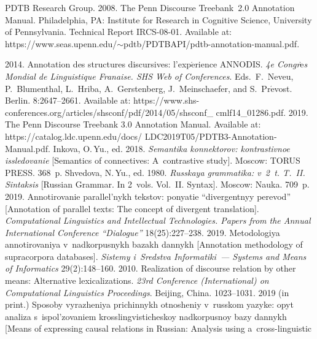 \begin{multicols}{2}
{{\begin{thebibliography}{99}
PDTB Research Group. 2008. The Penn Discourse Treebank~2.0 Annotation 
Manual.  Philadelphia, PA: Institute for Research in 
Cognitive Science, University of Pennsylvania. Technical Report IRCS-08-01.
Available at: {\sf 
https://www.seas.upenn.edu/$\sim$pdtb/PDTBAPI/pdtb-annotation-manual.pdf}.

 2014.  
Annotation des structures discursives: l'exp$\acute{\mbox{e}}$rience ANNODIS. 
\textit{4e Congr$\grave{\mbox{e}}$s Mondial de Linguistique 
\mbox{Fran{\normalsize\!}aise}. SHS Web of Conferences}.  Eds.\ 
F.~Neveu, P.~Blumenthal, L.~Hriba, A.~Gerstenberg, J.~Meinschaefer, 
and S.~Pr$\acute{\mbox{e}}$vost.  Berlin. 8:2647--2661. Available at: {\sf  
https://www.shs-conferences.org/articles/shsconf/pdf/2014/05/shsconf\_ cmlf14\_01286.pdf}.
\bibitem{10-in-1}
 2019. The Penn Discourse 
Treebank 3.0 Annotation Manual. Available at: {\sf 
https://catalog.ldc.upenn.edu/docs/ LDC2019T05/PDTB3-Annotation-Manual.pdf}.
\bibitem{11-in-1}
Inkova, O.\,Yu., ed. 2018. \textit{Semantika konnektorov: kontrastivnoe 
issledovanie} [Semantics of connectives: A~contrastive study]. Moscow: TORUS 
PRESS. 368~p.
Shvedova, N.\,Yu., ed. 1980. \textit{Russkaya grammatika: v~2~t. T.~II. Sintaksis} 
[Russian Grammar. In 2~vols. Vol.~II. Syntax]. Moscow: Nauka.  709~p.
\bibitem{13-in-1}
 2019. Annotirovanie parallel'nykh tekstov: ponyatie 
``divergentnyy perevod'' [Annotation of parallel texts: The concept of divergent 
translation]. \textit{Computational Linguistics and 
Intellectual Technologies. Papers from the Annual International Conference 
``Dialogue''} 18(25):227--238.
 2019. 
Metodologiya annotirovaniya v~nadkorpusnykh bazakh dannykh [Annotation 
methodology of supracorpora databases]. \textit{Sistemy i~Sredstva  
Informatiki~--- Systems and Means of Informatics} 29(2):148--160.
\bibitem{15-in-1}
 2010. Realization of discourse relation 
by other means: Alternative lexicalizations. \textit{23rd 
Conference (International) on Computational Linguistics Proceedings}. Beijing, 
China. 1023--1031.
 2019 (in print.) Sposoby 
vyrazheniya prichinnykh otnosheniy v~russkom yazyke: opyt analiza 
s~ispol'zovaniem krosslingvisticheskoy nadkorpusnoy bazy dannykh [Means of 
expressing causal relations in Russian: Analysis using a~cross-linguistic 

\end{thebibliography}}}
\end{multicols}
